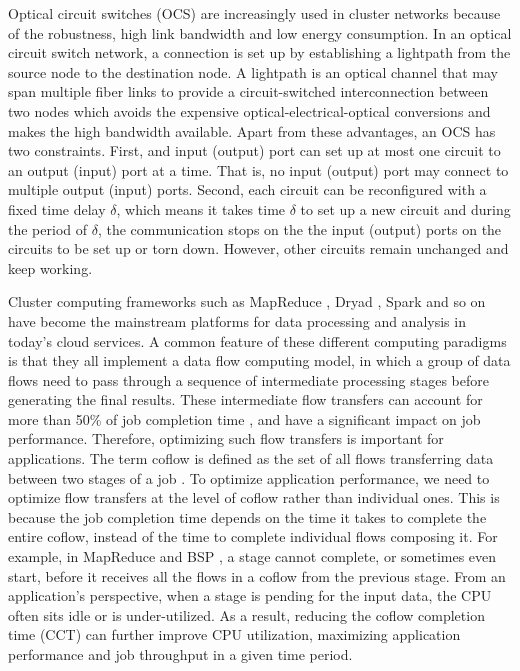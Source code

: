 Optical circuit switches (OCS) are increasingly used in cluster networks because of the robustness, high link bandwidth and low energy consumption. In an optical circuit switch network, a connection is set up by establishing a lightpath from the source node to the destination node. A lightpath is an optical channel that may span multiple fiber links to provide a circuit-switched interconnection between two nodes which avoids the expensive optical-electrical-optical conversions and makes the high bandwidth available. Apart from these advantages, an OCS has two constraints. First, and input (output) port can set up at most one circuit to an output (input) port at a time. That is, no input (output) port may connect to multiple output (input) ports. Second, each circuit can be reconfigured with a fixed time delay $\delta$, which means it takes time $\delta$ to set up a new circuit and during the period of $\delta$, the communication stops on the the input (output) ports on the circuits to be set up or torn down. However, other circuits remain unchanged and keep working.


Cluster computing frameworks such as MapReduce \cite{dean2008mapreduce}, Dryad \cite{isard2007dryad}, Spark \cite{zaharia2010spark} and so on have become the mainstream platforms for data processing and analysis in today’s cloud services. A common feature of these different computing paradigms is that they all implement a data flow computing model, in which a group of data flows need to pass through a sequence of intermediate processing stages before generating the final results. These intermediate flow transfers can account for more than 50\% of job completion time \cite{chowdhury2011managing}, and have a significant impact on job performance. Therefore, optimizing such flow transfers is important for applications. The term coflow is defined as the set of all flows transferring data between two stages of a job \cite{zhao2015rapier}. To optimize application performance, we need to optimize flow transfers at the level of coflow rather than individual ones. This is because the job completion time depends on the time it takes to complete the entire coflow, instead of the time to complete individual flows composing it. For example, in MapReduce \cite{dean2008mapreduce} and BSP \cite{cheatham1996bulk}, a stage cannot complete, or sometimes even start, before it receives all the flows in a coflow from the previous stage. From an application’s perspective, when a stage is pending for the input data, the CPU often sits idle or is under-utilized. As a result, reducing the coflow completion time (CCT) can further improve CPU utilization, maximizing application performance and job throughput in a given time period.



